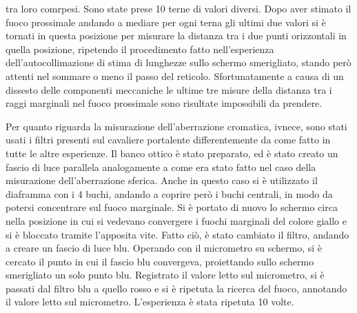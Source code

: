 tra loro comrpesi. Sono state prese 10 terne di valori diversi. Dopo aver stimato il fuoco prossimale andando a mediare per ogni terna gli ultimi due valori si è tornati in questa posizione per misurare la distanza tra i due punti orizzontali in quella posizione, ripetendo il procedimento fatto nell'esperienza dell'autocollimazione di stima di lunghezze sullo schermo smerigliato,  stando però attenti nel sommare o meno il passo del reticolo. Sfortunatamente a causa di un dissesto delle componenti meccaniche le ultime tre misure della distanza tra i raggi marginali nel fuoco prossimale sono risultate impossibili da prendere.


 Per quanto riguarda la misurazione dell'aberrazione cromatica, ivnece, sono stati usati i filtri presenti sul cavaliere portalente differentemente da come fatto in tutte le altre esperienze. Il banco ottico è stato preparato, ed è stato creato un fascio di luce parallela analogamente a come era stato fatto nel caso della misurazione dell'aberrazione sferica. Anche in questo caso si è utilizzato il diaframma con i 4 buchi, andando a coprire però i buchi centrali, in modo da potersi concentrare sul fuoco marginale. Si è portato di nuovo lo schermo circa nella posizione in cui si vedevano convergere i fuochi marginali del colore giallo e si è bloccato tramite l'apposita vite. Fatto ciò, è stato cambiato il filtro, andando a creare un fascio di luce blu. Operando con il micrometro su schermo, si è cercato il punto in cui il fascio blu convergeva, proiettando sullo schermo smerigliato un solo punto blu. Registrato il valore letto sul micrometro, si è passati dal filtro blu a quello rosso e si è ripetuta la ricerca del fuoco, annotando il valore letto sul micrometro. L'esperienza è stata ripetuta 10 volte.
